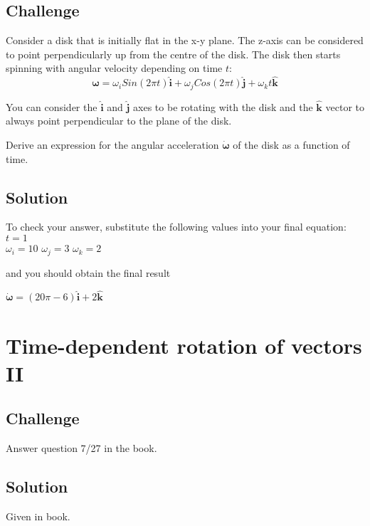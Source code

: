 \subsection*{Challenge}
Consider a disk that is initially flat in the x-y plane. The z-axis can be considered to point perpendicularly up from the centre of the disk. The disk then starts spinning with angular velocity depending on time $t$:
\begin{equation}
    \bm{\omega} = \omega_i Sin(2 \pi t) \bm{\hat{i}} + \omega_j Cos(2 \pi t) \bm{\hat{j}} + \omega_k t \bm{\hat{k}}
\end{equation}

You can consider the $\bm{\hat{i}}$ and $\bm{\hat{j}}$ axes to be rotating with the disk and the $\bm{\hat{k}}$ vector to always point perpendicular to the plane of the disk. 

Derive an expression for the angular acceleration $\bm{\dot{\omega}}$ of the disk as a function of time.


\subsection*{Solution}
To check your answer, substitute the following values into your final equation:
$t=1$\\
$\omega_i=10$
$\omega_j=3$
$\omega_k=2$

and you should obtain the final result

$\bm{\dot{\omega}} = (20 \pi - 6) \bm{\hat{i}} + 2 \bm{\hat{k}}$




\newpage
\section{Time-dependent rotation of vectors II}

\subsection*{Challenge}
Answer question 7/27 in the book.

\subsection*{Solution}
Given in book.
